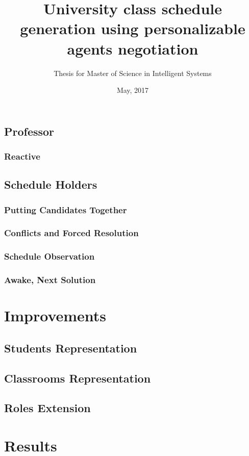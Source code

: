 \documentclass{beamer}
\title{University class schedule generation using personalizable agents negotiation}
\subtitle{Thesis for Master of Science in Intelligent Systems}
\institute[ITESM]{Tecnol\'{o}gico de Monterrey}
\date{May, 2017}
\begin{document}
\frame{\titlepage}










\subsection{Professor}
\subsubsection{Reactive}

\subsection{Schedule Holders}
\subsubsection{Putting Candidates Together}
\subsubsection{Conflicts and Forced Resolution}
\subsubsection{Schedule Observation}
\subsubsection{Awake, Next Solution}

\section{Improvements}
\subsection{Students Representation}
\subsection{Classrooms Representation}
\subsection{Roles Extension}

\section{Results}
\end{document}
